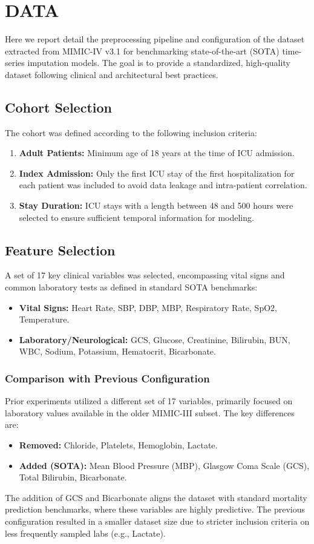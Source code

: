 \section{DATA}

Here we report detail the preprocessing pipeline and configuration of the dataset extracted from MIMIC-IV v3.1 for benchmarking state-of-the-art (SOTA) time-series imputation models. The goal is to provide a standardized, high-quality dataset following clinical and architectural best practices.

\subsection{Cohort Selection}
The cohort was defined according to the following inclusion criteria:
\begin{enumerate}
    \item \textbf{Adult Patients:} Minimum age of 18 years at the time of ICU admission.
    \item \textbf{Index Admission:} Only the first ICU stay of the first hospitalization for each patient was included to avoid data leakage and intra-patient correlation.
    \item \textbf{Stay Duration:} ICU stays with a length between 48 and 500 hours were selected to ensure sufficient temporal information for modeling.
\end{enumerate}

\subsection{Feature Selection}
A set of 17 key clinical variables was selected, encompassing vital signs and common laboratory tests as defined in standard SOTA benchmarks:
\begin{itemize}
    \item \textbf{Vital Signs:} Heart Rate, SBP, DBP, MBP, Respiratory Rate, SpO2, Temperature.
    \item \textbf{Laboratory/Neurological:} GCS, Glucose, Creatinine, Bilirubin, BUN, WBC, Sodium, Potassium, Hematocrit, Bicarbonate.
\end{itemize}

\subsubsection{Comparison with Previous Configuration}
Prior experiments utilized a different set of 17 variables, primarily focused on laboratory values available in the older MIMIC-III subset. The key differences are:
\begin{itemize}
    \item \textbf{Removed:} Chloride, Platelets, Hemoglobin, Lactate.
    \item \textbf{Added (SOTA):} Mean Blood Pressure (MBP), Glasgow Coma Scale (GCS), Total Bilirubin, Bicarbonate.
\end{itemize}
The addition of GCS and Bicarbonate aligns the dataset with standard mortality prediction benchmarks, where these variables are highly predictive. The previous configuration resulted in a smaller dataset size due to stricter inclusion criteria on less frequently sampled labs (e.g., Lactate).


